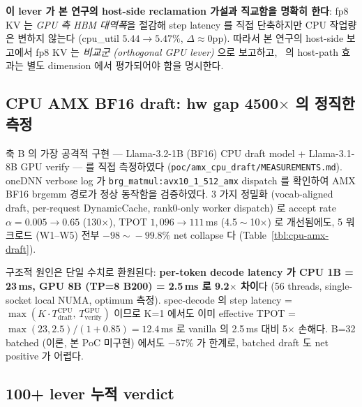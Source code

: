 \textbf{이 lever 가 본 연구의 host-side reclamation 가설과 직교함을 명확히 한다}:
fp8 KV 는 \emph{GPU 측 HBM 대역폭}을 절감해 step latency 를 직접 단축하지만 CPU 작업량은 변하지 않는다
(cpu\_util $5.44\!\to\!5.47\%$, $\Delta\!\approx\!0$pp).
따라서 본 연구의 host-side 보고에서 fp8 KV 는 \emph{비교군 (orthogonal GPU lever)} 으로 보고하고,
\algname\ 의 host-path 효과는 별도 dimension 에서 평가되어야 함을 명시한다.

\subsection{CPU AMX BF16 draft: hw gap 4500$\times$ 의 정직한 측정}
\label{subsec:res-amx-draft}



축 B 의 가장 공격적 구현 — Llama-3.2-1B (BF16) CPU draft model + Llama-3.1-8B GPU verify — 를
직접 측정하였다 (\texttt{poc/amx\_cpu\_draft/MEASUREMENTS.md}).
oneDNN verbose log 가 \texttt{brg\_matmul:avx10\_1\_512\_amx} dispatch 를 확인하여
AMX BF16 brgemm 경로가 정상 동작함을 검증하였다.
3 가지 정밀화 (vocab-aligned draft, per-request DynamicCache, rank0-only worker dispatch) 로
accept rate $\alpha\!=\!0.005 \to 0.65$ (130$\times$), TPOT $1{,}096 \to 111$\,ms (4.5$\!\sim\!$10$\times$) 로 개선됨에도,
5 워크로드 (W1--W5) 전부 $-98\!\sim\!-99.8\%$ net collapse 다 (Table~\ref{tbl:cpu-amx-draft}).

구조적 원인은 단일 수치로 환원된다:
\textbf{per-token decode latency 가 CPU 1B = 23\,ms, GPU 8B (TP=8 B200) = 2.5\,ms 로 9.2$\times$ 차이}다
(56 threads, single-socket local NUMA, optimum 측정).
spec-decode 의 step latency = $\max(K\!\cdot\!T_{\mathrm{draft}}^{\mathrm{CPU}},\, T_{\mathrm{verify}}^{\mathrm{GPU}})$
이므로 K=1 에서도 이미 effective TPOT = $\max(23, 2.5) / (1\!+\!0.85) = 12.4$\,ms 로
vanilla 의 2.5\,ms 대비 5$\times$ 손해다.
B=32 batched (이론, 본 PoC 미구현) 에서도 $-57\%$ 가 한계로, batched draft 도 net positive 가 어렵다.

\subsection{100+ lever 누적 verdict}
\label{subsec:res-100lever}



